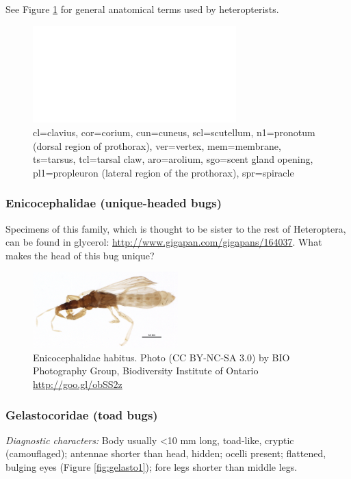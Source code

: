 \documentclass[letterpaper, 11pt]{article}
\begin{document}
\noindent{}See Figure \ref{fig:anatomy} for general anatomical terms used by heteropterists.\\

\begin{figure}[ht!]
 \centering
 \includegraphics[width=0.7\textwidth]{image14}
 \caption{cl=clavius, cor=corium, cun=cuneus, scl=scutellum, n1=pronotum (dorsal region of prothorax), ver=vertex, mem=membrane, ts=tarsus, tcl=tarsal claw, aro=arolium, sgo=scent gland opening, pl1=propleuron (lateral region of the prothorax), spr=spiracle}
 \label{fig:anatomy}
\end{figure}

\subsubsection{Enicocephalidae (unique-headed bugs)}
\noindent{}Specimens of this family, which is thought to be sister to the rest of Heteroptera, can be found in glycerol: \url{http://www.gigapan.com/gigapans/164037}. What makes the head of this bug unique?

\begin{figure}[ht!]
 \centering
 \includegraphics[width=0.5\textwidth]{EnicocephalidHabitus}
 \caption{Enicocephalidae habitus. Photo (CC BY-NC-SA 3.0) by BIO Photography Group, Biodiversity Institute of Ontario \url{http://goo.gl/obSS2z}}
 \label{fig:enicocephalid}
\end{figure}

\subsubsection{Gelastocoridae (toad bugs)}
\noindent{}\textit{Diagnostic characters:} Body usually \textless{}10 mm long, toad-like, cryptic (camouflaged); antennae shorter than head, hidden; ocelli present; flattened, bulging eyes (Figure \ref{fig:gelasto1}); fore legs shorter than middle legs.\\
\end{document}
